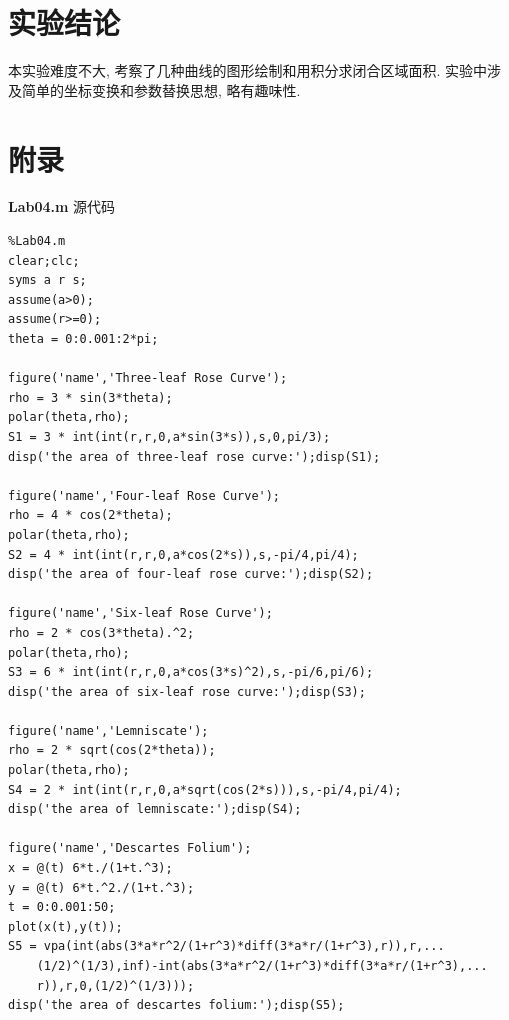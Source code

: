 \documentclass[a4paper,12pt]{article}
\begin{document}
\begin{CJK*}{UTF8}{gbsn}
\section{实验结论}
本实验难度不大, 考察了几种曲线的图形绘制和用积分求闭合区域面积. 实验中涉及简单的坐标变换和参数替换思想, 略有趣味性.



\section{附录}
\noindent\textbf{Lab04.m} 源代码
\vspace{-10pt}
\lstset{basicstyle=\ttfamily\footnotesize,escapechar=`}
\begin{lstlisting}
%Lab04.m
clear;clc;
syms a r s;
assume(a>0);
assume(r>=0);
theta = 0:0.001:2*pi;

figure('name','Three-leaf Rose Curve');
rho = 3 * sin(3*theta);
polar(theta,rho);
S1 = 3 * int(int(r,r,0,a*sin(3*s)),s,0,pi/3);
disp('the area of three-leaf rose curve:');disp(S1);

figure('name','Four-leaf Rose Curve');
rho = 4 * cos(2*theta);
polar(theta,rho);
S2 = 4 * int(int(r,r,0,a*cos(2*s)),s,-pi/4,pi/4);
disp('the area of four-leaf rose curve:');disp(S2);

figure('name','Six-leaf Rose Curve');
rho = 2 * cos(3*theta).^2;
polar(theta,rho);
S3 = 6 * int(int(r,r,0,a*cos(3*s)^2),s,-pi/6,pi/6);
disp('the area of six-leaf rose curve:');disp(S3);

figure('name','Lemniscate');
rho = 2 * sqrt(cos(2*theta));
polar(theta,rho);
S4 = 2 * int(int(r,r,0,a*sqrt(cos(2*s))),s,-pi/4,pi/4);
disp('the area of lemniscate:');disp(S4);

figure('name','Descartes Folium');
x = @(t) 6*t./(1+t.^3);
y = @(t) 6*t.^2./(1+t.^3);
t = 0:0.001:50;
plot(x(t),y(t));
S5 = vpa(int(abs(3*a*r^2/(1+r^3)*diff(3*a*r/(1+r^3),r)),r,...
    (1/2)^(1/3),inf)-int(abs(3*a*r^2/(1+r^3)*diff(3*a*r/(1+r^3),...
    r)),r,0,(1/2)^(1/3)));
disp('the area of descartes folium:');disp(S5);
\end{lstlisting}




\end{CJK*}
\end{document}
